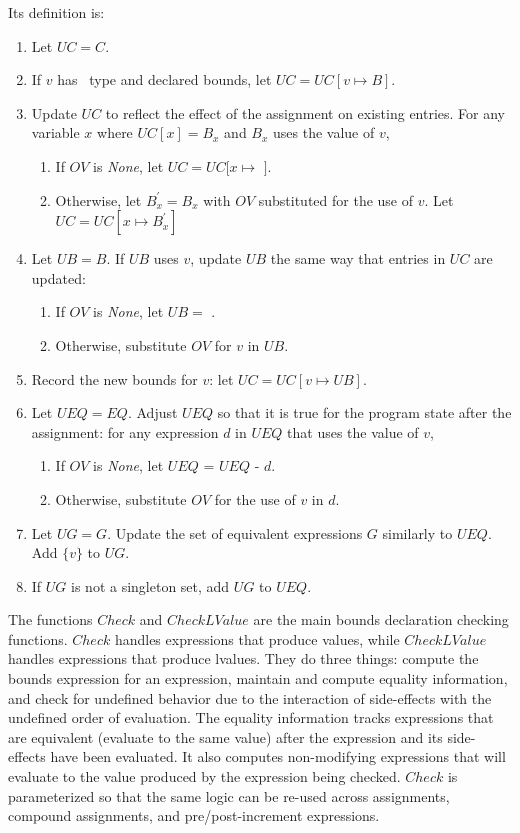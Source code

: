 Its definition is:
\begin{enumerate}
\item Let $\mathit{UC} = C$.
\item If $v$ has \arrayptr\ type and declared bounds, let $\mathit{UC} = \mathit{UC}[v \mapsto B]$.
\item Update $\mathit{UC}$ to reflect the effect of the assignment on existing entries.
For any variable $x$ where $\mathit{UC}[x] = B_x$ and $B_x$ uses the value of $v$,
\begin{enumerate}
\item If $OV$ is {\it None}, let $\mathit{UC} = \mathit{UC}[x \mapsto$ \boundsunknown $]$.
\item  Otherwise, let $B_x^\prime = B_x$ with $OV$ substituted for the use of $v$.
Let $\mathit{UC} = \mathit{UC}[x \mapsto B_x^\prime]$
\end{enumerate}
\item Let $UB = B$.  If $UB$ uses $v$, update $UB$ the same way that entries in $UC$
are updated:
\begin{enumerate}
\item If $OV$ is {\it None}, let $UB = $ \boundsunknown.
\item Otherwise, substitute $OV$ for $v$ in $UB$.
\end{enumerate}
\item Record the new bounds for $v$: let $\mathit{UC} = \mathit{UC}[v \mapsto UB]$.
\item Let $UEQ = EQ$.  Adjust $UEQ$ so that it is true for the program state after the assignment: for any expression $d$ in $UEQ$ that uses the value of $v$,
\begin{enumerate}
\item If $OV$ is {\it None}, let $UEQ$ = $UEQ $ - $d$.
\item Otherwise, substitute $OV$ for the use of $v$ in $d$.
\end{enumerate}
\item Let $UG = G$. Update the set of equivalent expressions $G$ similarly to $UEQ$. Add $\{v\}$ to $UG$.
\item If $UG$ is not a singleton set, add $UG$ to $UEQ$.
\end{enumerate}

The functions $Check$ and $CheckLValue$ are the main bounds declaration
checking functions.  $Check$ handles expressions that produce values,
while $CheckLValue$ handles expressions that produce lvalues.  They do three
things: compute the bounds expression for an expression, maintain and compute
equality information, and check for undefined behavior due to the interaction
of side-effects with the undefined order of evaluation.  The equality information
tracks expressions that are equivalent (evaluate to the same value)
after the expression and its side-effects have been evaluated.
It also computes non-modifying expressions that will evaluate to the value
produced by the expression being checked.  $Check$ is parameterized so
that the same logic can  be re-used across assignments, compound assignments,
and pre/post-increment expressions.

